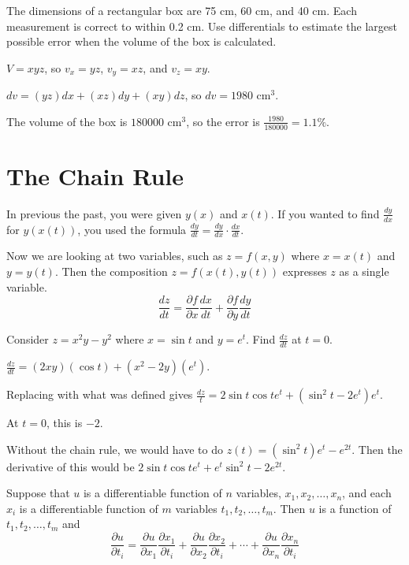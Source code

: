 \documentclass[../calc3.tex]{subfiles}
\begin{document}
\begin{example}
    The dimensions of a rectangular box are 75 cm, 60 cm, and 40 cm. Each measurement is correct to within 0.2 cm. Use differentials to estimate the largest possible error when the volume of the box is calculated.

    $V=xyz$, so $v_x=yz$, $v_y=xz$, and $v_z=xy$.

    $dv=(yz)dx+(xz)dy+(xy)dz$, so $dv=1980$ cm$^3$.

    The volume of the box is $180000$ cm$^3$, so the error is $\frac{1980}{180000}=1.1\%$.
\end{example}

\section{The Chain Rule}
In previous the past, you were given $y(x)$ and $x(t)$. If you wanted to find $\frac{dy}{dx}$ for $y(x(t))$, you used the formula $\frac{dy}{dt}=\frac{dy}{dx}\cdot \frac{dx}{dt}$.

Now we are looking at two variables, such as $z=f(x,y)$ where $x=x(t)$ and $y=y(t)$. Then the composition $z=f(x(t), y(t))$ expresses $z$ as a single variable.
\[ \frac{dz}{dt}=\frac{\partial f}{\partial x}\frac{dx}{dt}+\frac{\partial f}{\partial y}\frac{dy}{dt} \]

\begin{example}
    Consider $z=x^2y-y^2$ where $x=\sin t$ and $y=e^t$. Find $\frac{dz}{dt}$ at $t=0$.

    $\frac{dz}{dt}=(2xy)(\cos t)+(x^2-2y)(e^t)$.

    Replacing with what was defined gives $\frac{dz}{t}=2\sin t\cos t e^t + (\sin^2 t-2e^t)e^t$.

    At $t=0$, this is $-2$.
\end{example}

Without the chain rule, we would have to do $z(t)=(\sin^2 t)e^t-e^{2t}$. Then the derivative of this would be $2\sin t\cos t e^t+e^t\sin^2 t-2e^{2t}$. 

Suppose that $u$ is a differentiable function of $n$ variables, $x_1, x_2,\dots, x_n$, and each $x_i$ is a differentiable function of $m$ variables $t_1,t_2,\dots,t_m$. Then $u$ is a function of $t_1,t_2,\dots,t_m$ and 
\[ \frac{\partial u}{\partial t_i}=\frac{\partial u}{\partial x_1}\frac{\partial x_1}{\partial t_i}+\frac{\partial u}{\partial x_2}\frac{\partial x_2}{\partial t_i} + \cdots + \frac{\partial u}{\partial x_n}\frac{\partial x_n}{\partial t_i} \]
\end{document}
